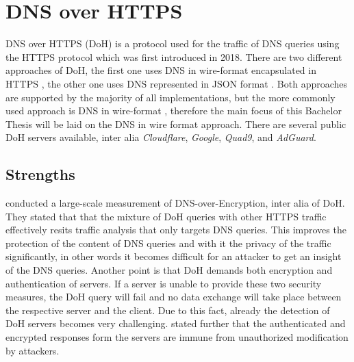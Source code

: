 \section{DNS over HTTPS} \label{doh}
DNS over HTTPS (DoH) is a protocol used for the traffic of DNS queries using the HTTPS protocol which was first introduced in 2018. There are two different approaches of DoH, the first one uses DNS in wire-format encapsulated in HTTPS \cite{RFC8484}, the other one uses DNS represented in JSON format \cite{RFC8427}. Both approaches are supported by the majority of all implementations, but the more commonly used approach is DNS in wire-format \cite{BoettingerEtAl_CostOfDoH}, therefore the main focus of this Bachelor Thesis will be laid on the DNS in wire format approach. There are several public DoH servers \cite{Blog_DNSProviders} available, inter alia \textit{Cloudflare}, \textit{Google}, \textit{Quad9}, and \textit{AdGuard}.

\subsection{Strengths} \label{doh_strengths}
\cite{Lu2019LageScaleMeasurement} conducted a large-scale measurement of DNS-over-Encryption, inter alia of DoH. They stated that that the mixture of DoH queries with other HTTPS traffic effectively resits traffic analysis that only targets DNS queries. This improves the protection of the content of DNS queries and with it the privacy of the traffic significantly, in other words it becomes difficult for an attacker to get an insight of the DNS queries. Another point is that DoH demands both encryption and authentication of servers. If a server is unable to provide these two security measures, the DoH query will fail and no data exchange will take place between the respective server and the client. Due to this fact, already the detection of DoH servers becomes very challenging. \cite{NSA_AdoptingEncryptedDNS} stated further that the authenticated and encrypted responses form the servers are immune from unauthorized modification by attackers.

